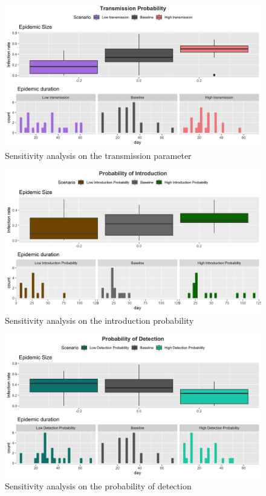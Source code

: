 \documentclass[
]{article}
\begin{document}
\begin{figure}
\caption{Sensitivity analysis on the transmission parameter}
\centering
\includegraphics{Figures/SensitivityAnalysis/Transmission}  
\end{figure}

\begin{figure}
\caption{Sensitivity analysis on the introduction probability}
\centering
\includegraphics{Figures/SensitivityAnalysis/Introduction}  
\end{figure}

\begin{figure}
\caption{Sensitivity analysis on the probability of detection}
\centering
\includegraphics{Figures/SensitivityAnalysis/ProbDetection}  
\end{figure}
\end{document}
